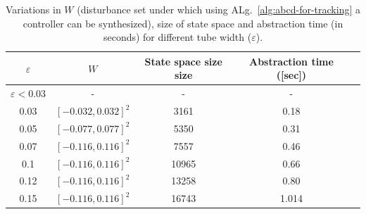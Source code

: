 \begin{table}[h!]
	\centering
	\caption{Variations in $W$ (disturbance set under which using ALg.~\ref{alg:abcd-for-tracking} a controller can be synthesized), size of state space and abstraction time (in seconds) for different tube width ($\varepsilon$).}
	\vspace{1mm}
	\begin{tabular}{|c|c|c|c|c|}
		\hline
		$\varepsilon$ &  $W$  & State space size size & Abstraction time ([sec])  \\
		\hline
		$\varepsilon<0.03$  & -    & -  & -  \\
		\hline
		0.03   & $[-0.032,0.032]^2$    & 3161  & 0.18  \\
		\hline
		0.05   & $[-0.077,0.077]^2$   & 5350  & 0.31  \\
		\hline
		0.07    & $[-0.116,0.116]^2$  & 7557  & 0.46  \\
		\hline
		0.1  &  $[-0.116,0.116]^2$   & 10965  & 0.66  \\
		\hline
		0.12    & $[-0.116,0.116]^2$  & 13258  & 0.80  \\
		\hline
		0.15   &$[-0.116,0.116]^2$  & 16743     & 1.014 \\
		\hline
	\end{tabular}
	\label{tab:inv_pend}
\end{table}
